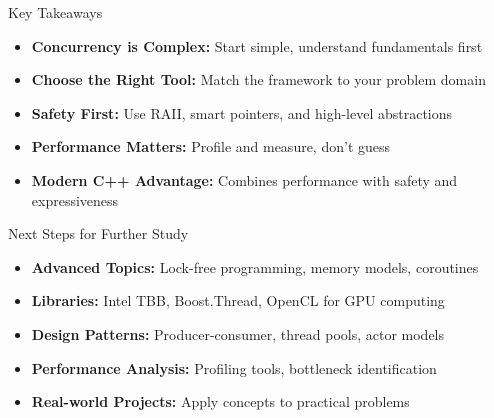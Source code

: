 \begin{frame}{Key Takeaways}
	\begin{itemize}
		\item \textbf{Concurrency is Complex:} Start simple, understand fundamentals first
		\item \textbf{Choose the Right Tool:} Match the framework to your problem domain
		\item \textbf{Safety First:} Use RAII, smart pointers, and high-level abstractions
		\item \textbf{Performance Matters:} Profile and measure, don't guess
		\item \textbf{Modern C++ Advantage:} Combines performance with safety and expressiveness
	\end{itemize}
\end{frame}

\begin{frame}{Next Steps for Further Study}
	\begin{itemize}
		\item \textbf{Advanced Topics:} Lock-free programming, memory models, coroutines
		\item \textbf{Libraries:} Intel TBB, Boost.Thread, OpenCL for GPU computing
		\item \textbf{Design Patterns:} Producer-consumer, thread pools, actor models
		\item \textbf{Performance Analysis:} Profiling tools, bottleneck identification
		\item \textbf{Real-world Projects:} Apply concepts to practical problems
	\end{itemize}
\end{frame}
